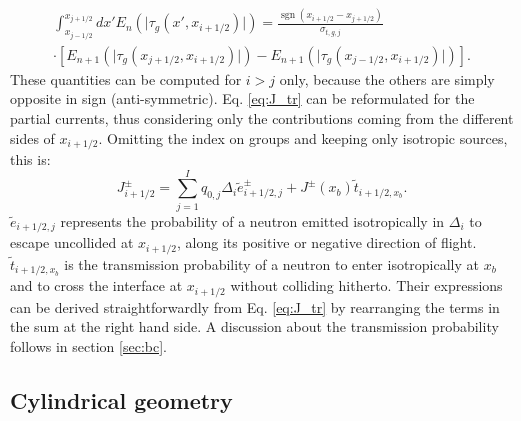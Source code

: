 \documentclass{ictt26}
\DeclareMathOperator{\sign}{sgn}
\begin{document}
\begin{equation*}
\begin{aligned}
\int_{x_{j-1/2}}^{x_{j+1/2}}{ dx' E_{n}\left(\lvert \tau_g(x', x_{i+1/2}) \rvert \right) } =
\frac{\sign(x_{i+1/2} - x_{j+1/2})}{\sigma_{t,g,j}} \\  \cdot
\left[
  E_{n+1} \left(\lvert \tau_g(x_{j+1/2}, x_{i+1/2}) \rvert \right)
 -E_{n+1} \left(\lvert \tau_g(x_{j-1/2}, x_{i+1/2}) \rvert \right)
\right].
\end{aligned}
\end{equation*}
These quantities can be computed for $i > j$ only, because the others are simply opposite in sign (anti-symmetric). Eq. \ref{eq:J_tr} can be reformulated for the partial currents, thus considering only the contributions coming from the different sides of $x_{i+1/2}$. Omitting the index on groups and keeping only isotropic sources, this is:
\begin{equation}
\label{eq:pcslab}
  J^\pm_{i+1/2} = \sum_{j=1}^I{q_{0,j} \Delta_i \tilde{e}^\pm_{i+1/2,j} + J^\pm(x_b) \tilde{t}_{i+1/2, x_b}}.
\end{equation}
$\tilde{e}_{i+1/2, j}$ represents the probability of a neutron emitted isotropically in $\Delta_i$ to escape uncollided at $x_{i+1/2}$, along its positive or negative direction of flight. $\tilde{t}_{i+1/2, x_b}$ is the transmission probability of a neutron to enter isotropically at $x_b$ and to cross the interface at $x_{i+1/2}$ without colliding hitherto. Their expressions can be derived straightforwardly from Eq. \ref{eq:J_tr} by rearranging the terms in the sum at the right hand side. A discussion about the transmission probability follows in section \ref{sec:bc}.


\subsection{Cylindrical geometry}
\label{sec:cylinder}
\end{document}
